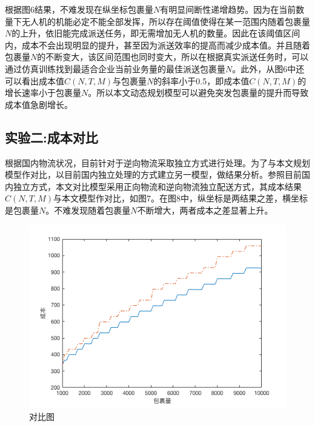 \documentclass[10.5pt,twocolumn]{jbuaa}
\begin{document}
	根据图6结果，不难发现在纵坐标包裹量$N$有明显间断性递增趋势。因为在当前数量下无人机的机能必定不能全部发挥，所以存在阈值使得在某一范围内随着包裹量$N$的上升，依旧能完成派送任务，即无需增加无人机的数量。因此在该阈值区间内，成本不会出现明显的提升，甚至因为派送效率的提高而减少成本值。并且随着包裹量$N$的不断变大，该区间范围也同时变大，所以在根据真实派送任务时，可以通过仿真训练找到最适合企业当前业务量的最佳派送包裹量$N$。此外，从图6中还可以看出成本值$C(N,T,M)$与包裹量$N$的斜率小于0.5，即成本值$C(N,T,M)$的增长速率小于包裹量$N$。所以本文动态规划模型可以避免突发包裹量的提升而导致成本值急剧增长。
















	\subsection{实验二:成本对比}
	根据国内物流状况，目前针对于逆向物流采取独立方式进行处理。为了与本文规划模型作对比，以目前国内独立处理的方式建立另一模型，做结果分析。参照目前国内独立方式，本文对比模型采用正向物流和逆向物流独立配送方式，其成本结果$C(N,T,M)$与本文模型作对比，如图7。在图8中，纵坐标是两结果之差，横坐标是包裹量$N$。不难发现随着包裹量$N$不断增大，两者成本之差显著上升。

	\begin{figure}[!h]
	\centering
	\includegraphics[scale=0.4]{Figs/compare.png}
	\caption{对比图}
	\label{fig:07}
	\end{figure}
\end{document}
